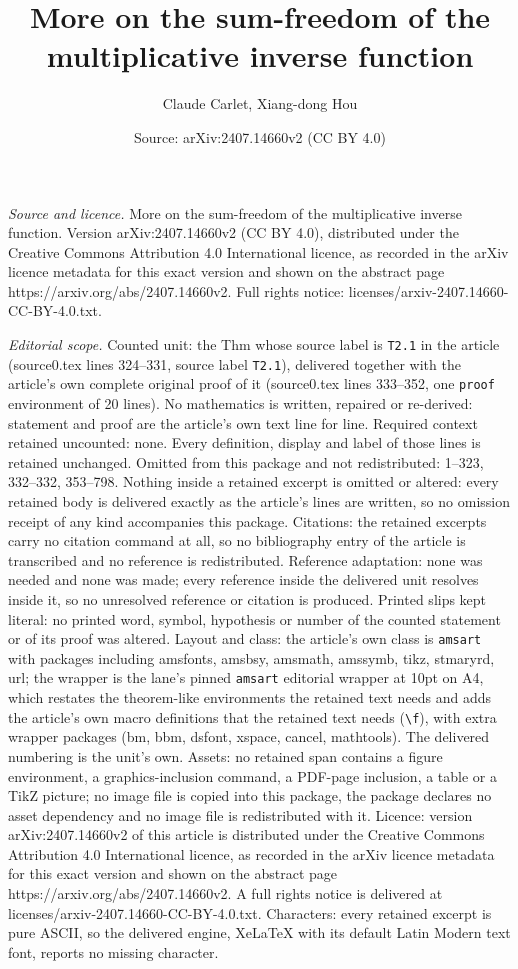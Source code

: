 \documentclass[10pt,a4paper]{amsart}
\title[More on the sum-freedom of the multiplicative inverse functi]{More on the sum-freedom of the multiplicative inverse function}
\author{Claude Carlet, Xiang-dong Hou}
\date{Source: arXiv:2407.14660v2 (CC BY 4.0)}
\begin{document}
\maketitle

\noindent\emph{Source and licence.} More on the sum-freedom of the multiplicative inverse function. Version arXiv:2407.14660v2 (CC BY 4.0), distributed under the Creative Commons Attribution 4.0 International licence, as recorded in the arXiv licence metadata for this exact version and shown on the abstract page https://arxiv.org/abs/2407.14660v2. Full rights notice: licenses/arxiv-2407.14660-CC-BY-4.0.txt.\par\smallskip

\noindent\textit{Editorial scope.} Counted unit: the Thm whose source label is \texttt{T2.1} in the article (source0.tex lines 324--331, source label \texttt{T2.1}), delivered together with the article's own complete original proof of it (source0.tex lines 333--352, one \texttt{proof} environment of 20 lines). No mathematics is written, repaired or re-derived: statement and proof are the article's own text line for line. Required context retained uncounted: none. Every definition, display and label of those lines is retained unchanged. Omitted from this package and not redistributed: 1--323, 332--332, 353--798. Nothing inside a retained excerpt is omitted or altered: every retained body is delivered exactly as the article's lines are written, so no omission receipt of any kind accompanies this package. Citations: the retained excerpts carry no citation command at all, so no bibliography entry of the article is transcribed and no reference is redistributed. Reference adaptation: none was needed and none was made; every reference inside the delivered unit resolves inside it, so no unresolved reference or citation is produced. Printed slips kept literal: no printed word, symbol, hypothesis or number of the counted statement or of its proof was altered. Layout and class: the article's own class is \texttt{amsart} with packages including amsfonts, amsbsy, amsmath, amssymb, tikz, stmaryrd, url; the wrapper is the lane's pinned \texttt{amsart} editorial wrapper at 10pt on A4, which restates the theorem-like environments the retained text needs and adds the article's own macro definitions that the retained text needs (\texttt{\textbackslash f}), with extra wrapper packages (bm, bbm, dsfont, xspace, cancel, mathtools). The delivered numbering is the unit's own. Assets: no retained span contains a figure environment, a graphics-inclusion command, a PDF-page inclusion, a table or a TikZ picture; no image file is copied into this package, the package declares no asset dependency and no image file is redistributed with it. Licence: version arXiv:2407.14660v2 of this article is distributed under the Creative Commons Attribution 4.0 International licence, as recorded in the arXiv licence metadata for this exact version and shown on the abstract page https://arxiv.org/abs/2407.14660v2. A full rights notice is delivered at licenses/arxiv-2407.14660-CC-BY-4.0.txt. Characters: every retained excerpt is pure ASCII, so the delivered engine, XeLaTeX with its default Latin Modern text font, reports no missing character.
\end{document}
